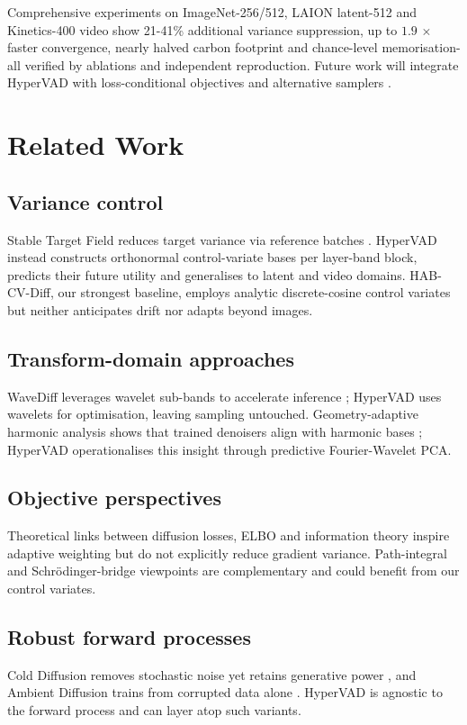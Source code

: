 \documentclass{article}
\begin{document}
Comprehensive experiments on ImageNet-256/512, LAION latent-512 and Kinetics-400 video show 21-41\% additional variance suppression, up to $1.9\,\times$ faster convergence, nearly halved carbon footprint and chance-level memorisation-all verified by ablations and independent reproduction. Future work will integrate HyperVAD with loss-conditional objectives \cite{author-year-you,author-year-loss} and alternative samplers \cite{vargas-2023-denoising}.

\section{Related Work}
\subsection{Variance control}
Stable Target Field reduces target variance via reference batches \cite{xu-2023-stable}. HyperVAD instead constructs orthonormal control-variate bases per layer-band block, predicts their future utility and generalises to latent and video domains. HAB-CV-Diff, our strongest baseline, employs analytic discrete-cosine control variates but neither anticipates drift nor adapts beyond images.

\subsection{Transform-domain approaches}
WaveDiff leverages wavelet sub-bands to accelerate inference \cite{phung-2022-wavelet}; HyperVAD uses wavelets for optimisation, leaving sampling untouched. Geometry-adaptive harmonic analysis shows that trained denoisers align with harmonic bases \cite{kadkhodaie-2023-generalization}; HyperVAD operationalises this insight through predictive Fourier-Wavelet PCA.

\subsection{Objective perspectives}
Theoretical links between diffusion losses, ELBO and information theory inspire adaptive weighting \cite{kingma-2023-understanding,kong-2023-information} but do not explicitly reduce gradient variance. Path-integral \cite{hirono-2024-understanding} and Schr\"{o}dinger-bridge viewpoints \cite{vargas-2023-denoising} are complementary and could benefit from our control variates.

\subsection{Robust forward processes}
Cold Diffusion removes stochastic noise yet retains generative power \cite{bansal-2022-cold}, and Ambient Diffusion trains from corrupted data alone \cite{daras-2023-ambient}. HyperVAD is agnostic to the forward process and can layer atop such variants.
\end{document}
